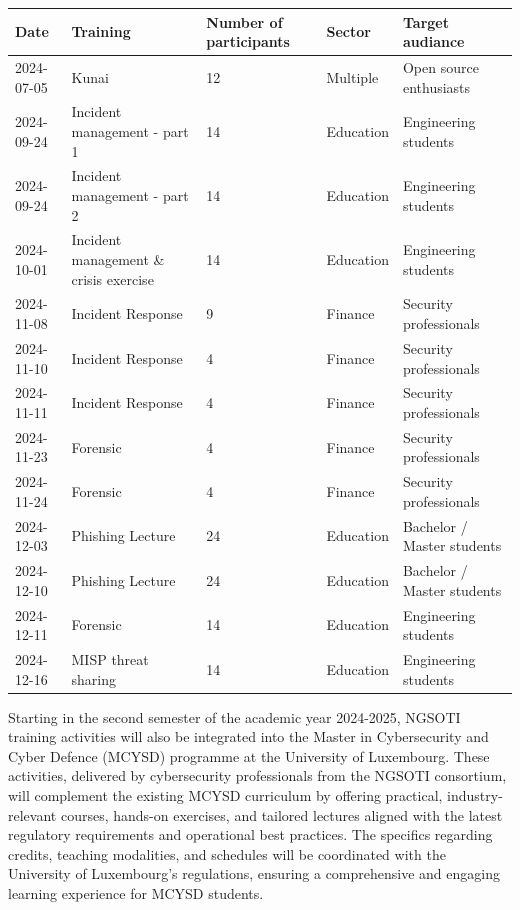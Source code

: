 \begin{table}
	\begin{tabular}{llp{2cm}ll}
		\hline
		Date       & Training            & Number of participants & Sector    & Target audiance         \\
		\hline
		2024-07-05 & Kunai               & 12                     & Multiple  & Open source enthusiasts \\
        2024-09-24 & Incident management - part 1  &14            & Education & Engineering students\\
        2024-09-24 & Incident management  - part 2 & 14           & Education & Engineering students \\
        2024-10-01 & Incident management \& crisis  exercise & 14 & Education & Engineering students\\
		2024-11-08 & Incident Response   & 9                      & Finance   & Security professionals  \\
		2024-11-10 & Incident Response   & 4                      & Finance   & Security professionals  \\
		2024-11-11 & Incident Response   & 4                      & Finance   & Security professionals  \\
		2024-11-23 & Forensic            & 4                      & Finance   & Security professionals  \\
		2024-11-24 & Forensic            & 4                      & Finance   & Security professionals  \\
        	2024-12-03 & Phishing Lecture    & 24 			  & Education & Bachelor / Master students  \\
        	2024-12-10 & Phishing Lecture    & 24 			  & Education & Bachelor / Master students  \\
		2024-12-11 & Forensic            & 14                     & Education & Engineering students    \\
		2024-12-16 & MISP threat sharing & 14                     & Education & Engineering students    \\
		\hline
	\end{tabular}
\end{table}

Starting in the second semester of the academic year 2024-2025, NGSOTI
training activities will also be integrated into the Master in
Cybersecurity and Cyber Defence (MCYSD) programme at the University of
Luxembourg. These activities, delivered by cybersecurity professionals
from the NGSOTI consortium, will complement the existing MCYSD
curriculum by offering practical, industry-relevant courses, hands-on
exercises, and tailored lectures aligned with the latest regulatory
requirements and operational best practices. The specifics regarding
credits, teaching modalities, and schedules will be coordinated with the
University of Luxembourg's regulations, ensuring a comprehensive and
engaging learning experience for MCYSD students.

